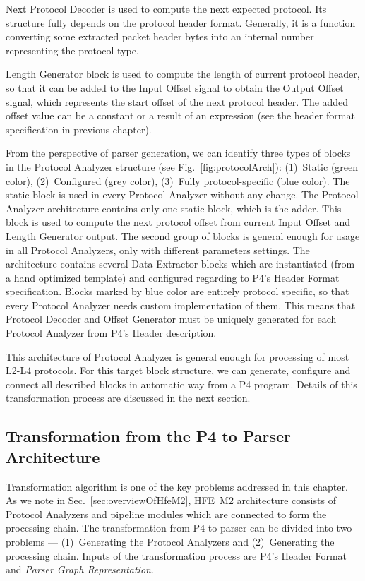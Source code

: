 Next Protocol Decoder is used to compute the next expected protocol. Its structure fully depends on the protocol header format.
Generally, it is a function converting some extracted packet header bytes into an internal number representing the protocol type.

Length Generator block is used to compute the length of current protocol header, so that it can be added to the Input Offset signal to obtain 
the Output Offset signal, which represents the start offset of the next protocol header.
The added offset value can be a constant or a result of an expression (see the header format specification in previous chapter).

From the perspective of parser generation, we can identify three types of blocks in the Protocol Analyzer structure 
(see Fig.~\ref{fig:protocolArch}): (1)~Static (green color), (2)~Configured (grey color), 
(3)~Fully protocol-specific (blue color). 
The static block is used in every Protocol Analyzer without any change. 
The Protocol Analyzer architecture contains only one static block, which is the adder.
This block is used to compute the next protocol offset from current Input Offset and Length Generator output. 
The second group of blocks is general enough for usage in all Protocol Analyzers, only with different parameters settings. 
The architecture contains several Data Extractor blocks which 
are instantiated (from a hand optimized template) and configured regarding to P4's Header Format specification. 
Blocks marked by blue color are entirely protocol specific, so that every Protocol Analyzer needs custom implementation of them.
This means that Protocol Decoder and Offset Generator must be uniquely generated for each Protocol Analyzer from P4's Header description.

This architecture of Protocol Analyzer is general enough for processing of most L2-L4 protocols. 
For this target block structure, we can generate, configure and connect all described blocks in automatic way from a P4 program. 
Details of this transformation process are discussed in the next section.

\subsection{Transformation from the P4 to Parser Architecture}
\label{sec:parserTransformation}

Transformation algorithm is one of the key problems addressed in this chapter.
As we note in Sec.~\ref{sec:overviewOfHfeM2}, HFE~M2 architecture consists of Protocol Analyzers and pipeline modules which are
connected to form the processing chain. 
The transformation from P4 to parser can be divided into two problems --- (1)~Generating the Protocol Analyzers and 
(2)~Generating the processing chain.
Inputs of the transformation process are P4's Header Format and \textit{Parser Graph Representation}.

